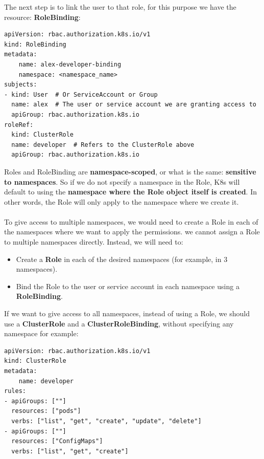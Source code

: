 \documentclass{article}
\newenvironment{blocktemplateII}[1]{%
    \tcolorbox[beamer,%
    noparskip,breakable,
    colframe=Green,%
    colbacklower=LimeGreen!75!LightGreen,%
    title=#1]}%
    {\endtcolorbox}
\newenvironment{codetemplate}[1][]{%
  \mybasecolorbox[#1]
  \itshape
}{%
  \endmybasecolorbox
}
\begin{document}
The next step is to link the user to that role, for this purpose we have the resource: \textbf{RoleBinding}:
\begin{codetemplate}{}
\begin{verbatim}
apiVersion: rbac.authorization.k8s.io/v1
kind: RoleBinding
metadata:
    name: alex-developer-binding
    namespace: <namespace_name>
subjects:
- kind: User  # Or ServiceAccount or Group
  name: alex  # The user or service account we are granting access to
  apiGroup: rbac.authorization.k8s.io
roleRef:
  kind: ClusterRole
  name: developer  # Refers to the ClusterRole above
  apiGroup: rbac.authorization.k8s.io
\end{verbatim}
\end{codetemplate}

\begin{blocktemplateII}{NOTE}
Roles and RoleBinding are \textbf{namespace-scoped}, or what is the same: \textbf{sensitive to namespaces}. So if we do not specify a namespace in the Role, K8s will default to using the \textbf{namespace where the Role object itself is created}. In other words, the Role will only apply to the namespace where we create it.
\\\\
To give access to multiple namespaces, we would need to create a Role in each of the namespaces where we want to apply the permissions. we cannot assign a Role to multiple namespaces directly. Instead, we will need to:
\begin{itemize}
    \item Create a \textbf{Role} in each of the desired namespaces (for example, in 3 namespaces).
    \item Bind the Role to the user or service account in each namespace using a \textbf{RoleBinding}.
\end{itemize}
If we want to give access to all namespaces, instead of using a Role, we should use a \textbf{ClusterRole} and a \textbf{ClusterRoleBinding}, without specifying any namespace for example:

\begin{codetemplate}{}
\begin{verbatim}
apiVersion: rbac.authorization.k8s.io/v1
kind: ClusterRole
metadata:
    name: developer
rules:
- apiGroups: [""]
  resources: ["pods"]
  verbs: ["list", "get", "create", "update", "delete"]
- apiGroups: [""]
  resources: ["ConfigMaps"]
  verbs: ["list", "get", "create"]
\end{verbatim}
\end{codetemplate}


\end{blocktemplateII}
\end{document}
